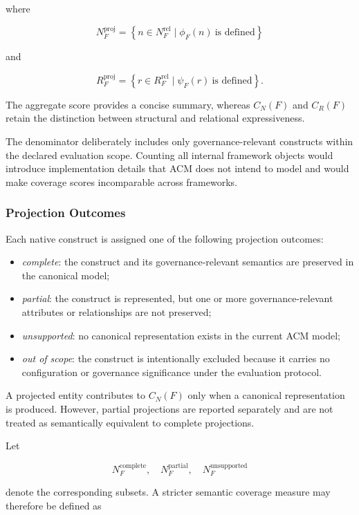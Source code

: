 \documentclass[10pt]{article}
\begin{document}
where

\[
N_F^{\mathrm{proj}}
=
\left\{
n\in N_F^{\mathrm{rel}}
\mid
\phi_F(n)\ \text{is defined}
\right\}
\]

and

\[
R_F^{\mathrm{proj}}
=
\left\{
r\in R_F^{\mathrm{rel}}
\mid
\psi_F(r)\ \text{is defined}
\right\}.
\]

The aggregate score provides a concise summary, whereas $C_N(F)$ and $C_R(F)$
retain the distinction between structural and relational expressiveness.

The denominator deliberately includes only governance-relevant constructs
within the declared evaluation scope. Counting all internal framework objects
would introduce implementation details that ACM does not intend to model and
would make coverage scores incomparable across frameworks.

\subsubsection{Projection Outcomes}

Each native construct is assigned one of the following projection outcomes:

\begin{itemize}
	\item \emph{complete}: the construct and its governance-relevant semantics
	are preserved in the canonical model;
	\item \emph{partial}: the construct is represented, but one or more
	governance-relevant attributes or relationships are not preserved;
	\item \emph{unsupported}: no canonical representation exists in the current
	ACM model;
	\item \emph{out of scope}: the construct is intentionally excluded because
	it carries no configuration or governance significance under the evaluation
	protocol.
\end{itemize}

A projected entity contributes to $C_N(F)$ only when a canonical representation
is produced. However, partial projections are reported separately and are not
treated as semantically equivalent to complete projections.

Let

\[
N_F^{\mathrm{complete}},
\quad
N_F^{\mathrm{partial}},
\quad
N_F^{\mathrm{unsupported}}
\]

denote the corresponding subsets. A stricter semantic coverage measure may
therefore be defined as
\end{document}
